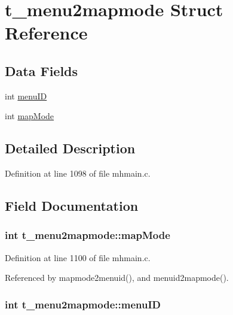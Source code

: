 \hypertarget{structt__menu2mapmode}{\section{t\+\_\+menu2mapmode Struct Reference}
\label{structt__menu2mapmode}
}
\subsection*{Data Fields}
\begin{DoxyCompactItemize}
\item 
int \hyperlink{structt__menu2mapmode_a0472bb82bd0d987fafda9d596ab4e8a8}{menu\+I\+D}
\item 
int \hyperlink{structt__menu2mapmode_a3bd2d37d8c12e35febd72cd0f82a71b4}{map\+Mode}
\end{DoxyCompactItemize}


\subsection{Detailed Description}


Definition at line 1098 of file mhmain.\+c.



\subsection{Field Documentation}
\hypertarget{structt__menu2mapmode_a3bd2d37d8c12e35febd72cd0f82a71b4}{
\subsubsection[{map\+Mode}]{\setlength{\rightskip}{0pt plus 5cm}int t\+\_\+menu2mapmode\+::map\+Mode}}\label{structt__menu2mapmode_a3bd2d37d8c12e35febd72cd0f82a71b4}


Definition at line 1100 of file mhmain.\+c.



Referenced by mapmode2menuid(), and menuid2mapmode().

\hypertarget{structt__menu2mapmode_a0472bb82bd0d987fafda9d596ab4e8a8}{
\subsubsection[{menu\+I\+D}]{\setlength{\rightskip}{0pt plus 5cm}int t\+\_\+menu2mapmode\+::menu\+I\+D}}\label{structt__menu2mapmode_a0472bb82bd0d987fafda9d596ab4e8a8}


